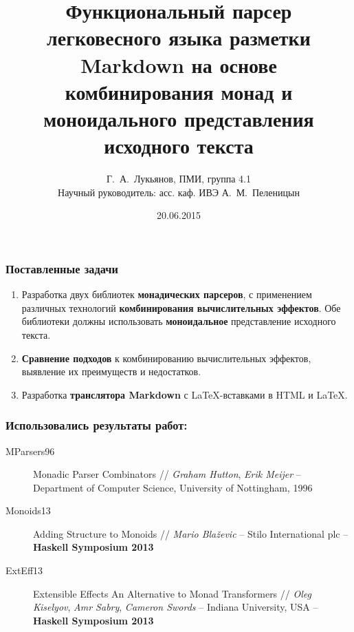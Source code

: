 \documentclass[12pt, compress, t]{beamer}
\title{Функциональный парсер легковесного языка разметки Markdown
на основе комбинирования монад и моноидального представления исходного текста}
\date{20.06.2015}
\author{Г.~А.~Лукьянов, ПМИ, группа 4.1 \\{Научный руководитель: асс. каф. ИВЭ А.~М.~Пеленицын}}
\institute{Институт математики, механики и компьютерных наук ЮФУ}
\begin{document}
\maketitle

\begin{frame}[fragile]
  \frametitle{Поставленные задачи}
  \begin{enumerate}
    \item Разработка двух библиотек \textbf{монадических парсеров}, 
    с применением различных технологий \textbf{комбинирования вычислительных 
    эффектов}. Обе библиотеки должны использовать \textbf{моноидальное}
    представление исходного текста.
    \item \textbf{Сравнение подходов} к комбинированию вычислительных эффектов, выявление их преимуществ и недостатков.
    \item Разработка \textbf{транслятора Markdown} с \LaTeX-вставками в HTML и \LaTeX.
  \end{enumerate}
\end{frame}

\begin{frame}[fragile]
  \frametitle{Использовались результаты работ: }
  \begin{description}
    \item [MParsers96]
    Monadic Parser Combinators // \textit{Graham Hutton}, \textit{Erik Meijer} –
Department of Computer Science, University of Nottingham, 1996
    \item [Monoids13]
    Adding Structure to Monoids // \textit{Mario Blaževic} – Stilo International plc – \\\textbf{Haskell Symposium 2013}
    \item [ExtEff13] 
    Extensible Effects An Alternative to Monad Transformers // \textit{Oleg
Kiselyov}, \textit{Amr Sabry}, \textit{Cameron Swords} – Indiana University, USA – \textbf{Haskell Symposium 2013}
  \end{description}
\end{frame}

\end{document}
